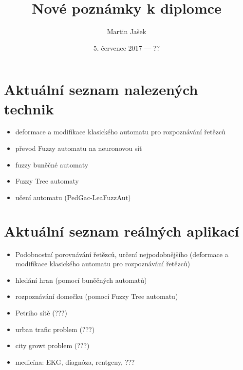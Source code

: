 \documentclass[a4paper,10pt]{article}
\title{Nové poznámky k diplomce}
\author{Martin Jašek}
\date{5. červenec 2017 --- ??}
\begin{document}
\maketitle
\tableofcontents
\newpage

\section{Aktuální seznam nalezených technik}

\begin{itemize}
 \item deformace a modifikace klasického automatu pro rozpoznávání řetězců
 \item převod Fuzzy automatu na neuronovou síť
 \item fuzzy buněčné automaty
 \item Fuzzy Tree automaty
 \item učení automatu (PedGac-LeaFuzzAut)
\end{itemize}

\section{Aktuální seznam reálných aplikací}
\begin{itemize}
 \item Podobnostní porovnávání řetězců, určení nejpodobnějšího (deformace a modifikace klasického automatu pro rozpoznávání řetězců)
 \item hledání hran (pomocí buněčných automatů)
 \item rozpoznávání domečku (pomocí Fuzzy Tree automatu)
 \item Petriho sítě (???)
 \item urban trafic problem (???)
 \item city growt problem (???)
 \item medicína: EKG, diagnóza, rentgeny, ???
\end{itemize}
\end{document}
